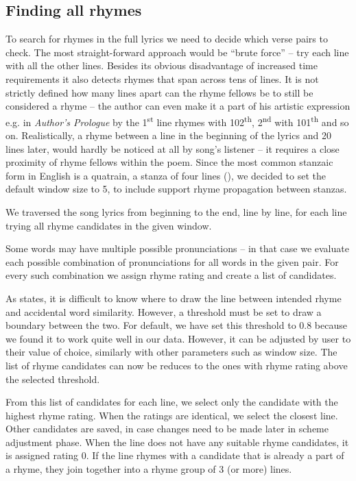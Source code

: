 \subsection{Finding all rhymes}\label{finding-all-rhymes}
To search for rhymes in the full lyrics we need to decide which verse pairs to check. The most straight-forward approach would be ``brute force'' -- try each line with all the other lines. Besides its obvious disadvantage of increased time requirements it also detects rhymes that span across tens of lines. It is not strictly defined how many lines apart can the rhyme fellows be to still be considered a rhyme -- the author can even make it a part of his artistic expression  e.g. in \textit{Author's Prologue} by \cite{thomas1952author} the 1\textsuperscript{st} line rhymes with 102\textsuperscript{th}, 2\textsuperscript{nd} with 101\textsuperscript{th} and so on. Realistically, a rhyme between a line in the beginning of the lyrics and 20 lines later, would hardly be noticed at all by song's listener -- it requires a close proximity of rhyme fellows within the poem. Since the most common stanzaic form in English is a quatrain, a stanza of four lines (\cite{eastman1970norton}), we decided to set the default window size to 5, to include support rhyme propagation between stanzas. 

We traversed the song lyrics from beginning to the end, line by line, for each line trying all rhyme candidates in the given window.

Some words may have multiple possible pronunciations -- in that case we evaluate each possible combination of pronunciations for all words in the given pair. For every such combination we assign rhyme rating and create a list of candidates.

As \cite{rhymes_overview} states, it is difficult to know where to draw the line between intended rhyme and accidental word similarity. However, a threshold must be set to draw a boundary between the two. For default, we have set this threshold to 0.8 because we found it to work quite well in our data. However, it can be adjusted by user to their value of choice, similarly with other parameters such as window size. The list of rhyme candidates can now be reduces to the ones with rhyme rating above the selected threshold.

From this list of candidates for each line, we select only the candidate with the highest rhyme rating. When the ratings are identical, we select the closest line. Other candidates are saved, in case changes need to be made later in scheme adjustment phase. When the line does not have any suitable rhyme candidates, it is assigned rating 0. If the line rhymes with a candidate that is already a part of a rhyme, they join together into a rhyme group of 3 (or more) lines.
 



